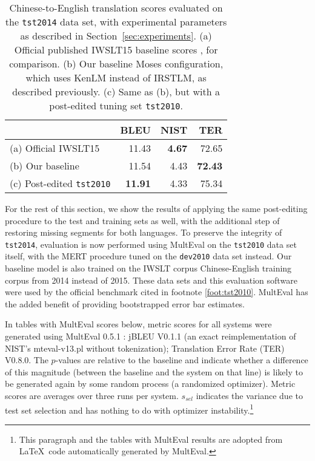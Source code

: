 {%
\begin{table}[ht]
\centering
\begin{tabular}{|l|r|r|r|}
\hline
                    & BLEU  & NIST & TER    \\ \hline
(a) Official IWSLT15    & 11.43 & \textbf{4.67} & 72.65  \\ \hline
(b) Our baseline        & 11.54 & 4.43 & \textbf{72.43} \\ \hline
(c) Post-edited {\small \tt tst2010} & \textbf{11.91} & 4.33 & 75.34 \\ \hline
\end{tabular}

\caption{ \label{tab:tst2010}
    Chinese-to-English translation scores evaluated on the {\small \tt tst2014} data set, with experimental parameters as described in Section~\ref{sec:experiments}. 
    (a) Official published IWSLT15 baseline scores , for comparison.
    (b) Our baseline Moses configuration, which uses KenLM instead of IRSTLM, as described previously.
    (c) Same as (b), but with a post-edited tuning set {\small \tt tst2010}. 
} %
\end{table}

For the rest of this section, we show the results of applying the same post-editing procedure to the test and training sets as well, with the additional step of restoring missing segments for both languages. 
To preserve the integrity of {\small \tt tst2014}, evaluation is now performed using MultEval  on the {\small \tt tst2010} data set itself, with the MERT procedure tuned on the {\small \tt dev2010} data set instead.
Our baseline model is also trained on the IWSLT corpus Chinese-English training corpus from 2014 instead of 2015.
These data sets and this evaluation software were used by the official benchmark cited in footnote \ref{foot:tst2010}.
MultEval has the added benefit of providing bootstrapped error bar estimates.

In tables with MultEval scores below, metric scores for all systems were generated using MultEval 0.5.1 : jBLEU V0.1.1 (an exact reimplementation of NIST's mteval-v13.pl without tokenization); Translation Error Rate (TER) V0.8.0. 
The $p$-values are relative to the baseline and indicate whether a difference of this magnitude (between the baseline and the system on that line) is likely to be generated again by some random process (a randomized optimizer). 
Metric scores are averages over three runs per system. 
$s_{sel}$ indicates the variance due to test set selection and has nothing to do with optimizer instability.\footnote{
    This paragraph and the tables with MultEval results are adopted from \LaTeX~code automatically generated by MultEval.
}




}
